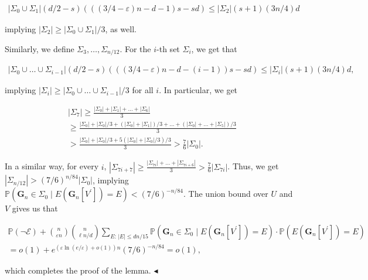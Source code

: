 \[\begin{gathered}
|\Sigma_{0}\cup\Sigma_{1}|(d/2-s)(((3/4-\varepsilon)n-d-1)s-sd)\leq|\Sigma_{2}|(s+1)(3n/4)d
\end{gathered}\]


implying $|\Sigma_{2}|\geq|\Sigma_{0}\cup\Sigma_{1}|/3$, as well.\par




Similarly, we define $\Sigma_{3},\ldots,\Sigma_{n/12}$. For the $i$-th set $\Sigma_{i}$, we get that\par


\[\begin{gathered}
|\Sigma_{0}\cup\ldots\cup\Sigma_{i-1}|(d/2-s)(((3/4-\varepsilon)n-d-(i-1))s-sd)\leq|\Sigma_{i}|(s+1)(3n/4)d,
\end{gathered}\]


implying $|\Sigma_{i}|\geq|\Sigma_{0}\cup\ldots\cup\Sigma_{i-1}|/3$ for all $i$. In particular, we get\par


\[\begin{gathered}
\displaystyle|\Sigma_{7}| \displaystyle\geq\frac{|\Sigma_{0}|+|\Sigma_{1}|+\ldots+|\Sigma_{6}|}{3} \\
\displaystyle\geq\frac{|\Sigma_{0}|+|\Sigma_{0}|/3+(|\Sigma_{0}|+|\Sigma_{1}|)/3+\ldots+(|\Sigma_{0}|+\ldots+|\Sigma_{5}|)/3}{3} \\
\displaystyle>\frac{|\Sigma_{0}|+|\Sigma_{0}|/3+5(|\Sigma_{0}|+|\Sigma_{0}|/3)/3}{3}>\frac{7}{6}|\Sigma_{0}|.
\end{gathered}\]


In a similar way, for every $i$,
$|\Sigma_{7i+7}|\geq\frac{|\Sigma_{7i}|+\ldots+|\Sigma_{7i+6}|}{3}>\frac{7}{6}|\Sigma_{7i}|$.
Thus, we get $|\Sigma_{n/12}|>(7/6)^{n/84}|\Sigma_{0}|$,
implying $\mathbb{P}(\mathbf{G}_{n}\in\Sigma_{0}\mid E(\mathbf{G}_{n}[V^{\prime}])=E)<(7/6)^{-n/84}$. The union bound over $U$ and $V$ gives us that\par


\[\begin{gathered}
\mathbb{P}(\neg\mathcal{E})+{n\choose\varepsilon n}{n\choose\ell n/d}\sum_{E:\,|E|\leq dn/15}\mathbb{P}(\mathbf{G}_{n}\in\Sigma_{0}\mid E(\mathbf{G}_{n}[V^{\prime}])=E)\cdot\mathbb{P}(E(\mathbf{G}_{n}[V^{\prime}])=E)\\
=o(1)+e^{(\varepsilon\ln(e/\varepsilon)+o(1))n}(7/6)^{-n/84}=o(1),
\end{gathered}\]


which completes the proof of the lemma.
$\blacktriangleleft$\par







